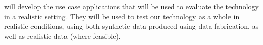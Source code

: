\begin{Workpackage}{\thewpno}
\begin{Task}
\TaskResults{%
\ref{del:eval1},
\ref{del:eval2},
\ref{del:eval3}
}
\TaskHeader{}
\theTask{} will develop the use case applications that will be used to evaluate the \TheProject{} technology in a realistic setting. They will be used to test our technology as a whole in realistic conditions, using both synthetic data produced using data fabrication, as well as realistic data (where feasible). 


\end{Task}
\end{Workpackage}
